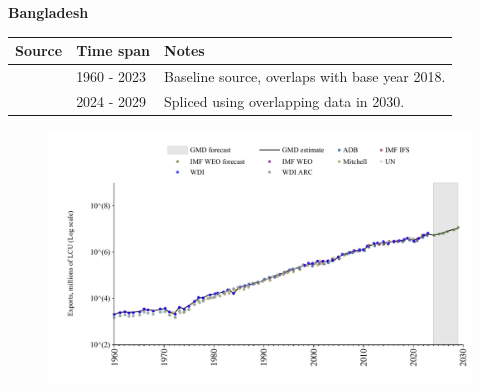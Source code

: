 \documentclass[12pt,a4paper,landscape]{article}
\begin{document}
\begin{adjustbox}{max totalsize={\paperwidth}{\paperheight},center}
\begin{minipage}[t][\textheight][t]{\textwidth}
\vspace*{0.5cm}
{}
\begin{center}
{\Large\bfseries Bangladesh}
\end{center}
\vspace{0.5cm}
\begin{table}[H]
\centering
\small
\begin{tabular}{|l|l|l|}
\hline
\textbf{Source} & \textbf{Time span} & \textbf{Notes} \\
\hline
\rowcolor{white}\cite{WDI}& 1960 - 2023 &Baseline source, overlaps with base year 2018.\\
\rowcolor{lightgray}\cite{IMF_WEO_forecast}& 2024 - 2029 &Spliced using overlapping data in 2030.\\
\hline
\end{tabular}
\end{table}
\begin{figure}[H]
\centering
\includegraphics[width=\textwidth,height=0.6\textheight,keepaspectratio]{graphs/BGD_exports.pdf}
\end{figure}
\end{minipage}
\end{adjustbox}
\end{document}
